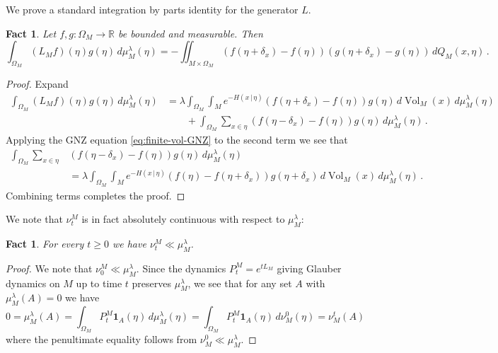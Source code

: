 \documentclass[11pt]{amsart}
\newtheorem{fact}[theorem]{Fact}
\theoremstyle{definition}
\theoremstyle{remark}
\newcommand{\R}{\mathbb{R}}
\newcommand{\Vol}{\operatorname{Vol}}
\newcommand{\one}{\mathbf{1}}
\begin{document}
   
We prove a standard integration by parts identity for the generator $L$.
\begin{fact}\label{fact:IBP-generator}
  	Let $f,g: \Omega_M\to \R$ be bounded and measurable.  Then $$\int_{\Omega_M} (L_M f)(\eta) g(\eta) \,d\mu_M^\lambda(\eta) = -\iint_{M\times \Omega_M } (f(\eta + \delta_x) - f(\eta))(g(\eta + \delta_x) - g(\eta)) \,dQ_M(x,\eta)\,.$$
\end{fact}
\begin{proof} Expand
	\begin{align*}
		\int_{\Omega_M} (L_M f)(\eta) g(\eta) \,d\mu_M^\lambda(\eta) &= \lambda \int_{\Omega_M} \int_{M} e^{-H(x\,|\,\eta)} (f(\eta + \delta_x) - f(\eta)) g(\eta)\,d\Vol_M(x) \,d\mu_M^\lambda(\eta) \\
		&\qquad + \int_{\Omega_M}\sum_{x \in \eta} (f(\eta - \delta_x) - f(\eta))  g(\eta)  \,d\mu_M^\lambda(\eta)\,.
	\end{align*}
	Applying the GNZ equation \eqref{eq:finite-vol-GNZ} to the second term we see that \begin{align*}
		 \int_{\Omega_M}\sum_{x \in \eta}& (f(\eta - \delta_x) - f(\eta))  g(\eta)  \,d\mu_M^\lambda(\eta) \\
		 &= \lambda \int_{\Omega_M} \int_{M} e^{-H(x\,|\,\eta)} (f(\eta) - f(\eta+\delta_x)) g(\eta + \delta_x)\,d\Vol_M(x) \,d\mu_M^\lambda(\eta)\,.
	\end{align*}
	Combining terms completes the proof.
\end{proof}


We note that $\nu_t^M$ is in fact absolutely continuous with respect to $\mu_M^\lambda$:

\begin{fact}\label{fact:nu_t-density}
	For every $t \geq 0$ we have $\nu_t^M \ll \mu_M^\lambda$.
\end{fact}
\begin{proof}
	We note that $\nu_0^M \ll \mu_M^\lambda$.  Since the dynamics $P_t^M = e^{t L_M}$ giving Glauber dynamics on $M$ up to time $t$ preserves $\mu_M^\lambda$, we see that for any set $A$ with $\mu_M^\lambda(A) = 0$ we have \begin{equation*}0 = \mu_M^\lambda(A) = \int_{\Omega_M} P_t^M \one_A(\eta) \,d\mu_M^\lambda(\eta) =  \int_{\Omega_M} P_t^M \one_A(\eta) \,d\nu_M^0(\eta) = \nu_M^t(A) \end{equation*}
    where the penultimate equality follows from $\nu_M^0 \ll \mu_M^\lambda.$
\end{proof}
\end{document}
